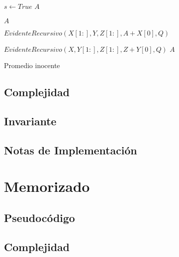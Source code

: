 \documentclass[]{article}
\numberwithin{equation}{section}
\numberwithin{figure}{section}
\theoremstyle{definition}
\begin{document}
	\begin{algorithm}[H]
	\begin{algorithmic}[1]


  			\State $s \leftarrow True$
  			\State\Return $A$
  		\EndIf
  		
  		
  				\State\Return $A$
  			\EndIf
  			
  						\State $EvidenteRecursivo(X[1:],Y,Z[1:],A+X[0],Q) $
  					\EndIf
  					
  				\EndIf
  						\State $EvidenteRecursivo(X,Y[1:],Z[1:],Z+Y[0],Q)$
  					\EndIf
  				\EndIf
  			\EndIf
  		\EndIf
  		\State\Return $A$

	\EndProcedure

	\end{algorithmic}
	\caption{\foreignlanguage{english}{Promedio inocente}}
	\end{algorithm}
	
	
	\subsection*{Complejidad}
	
	\subsection*{Invariante}
	
	\subsection*{Notas de Implementación}

\section*{Memorizado}

	\subsection*{Pseudocódigo}
	
	\subsection*{Complejidad}
	
\end{document}
